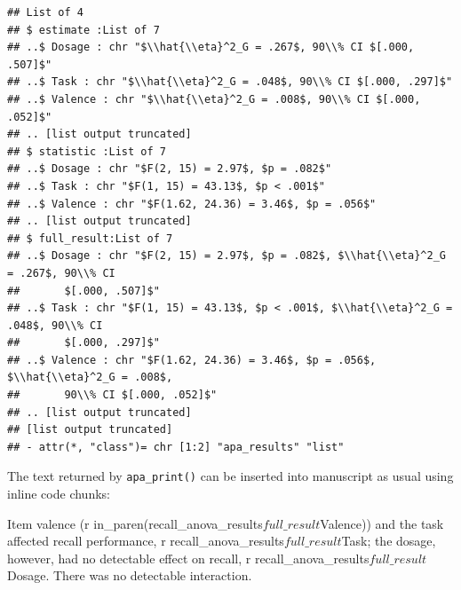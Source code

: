 \documentclass[
  ,man,floatsintext]{apa6}
\newenvironment{Shaded}{\begin{snugshade}}{\end{snugshade}}
\newcommand{\AttributeTok}[1]{\textcolor[rgb]{0.77,0.63,0.00}{#1}}
\newcommand{\FunctionTok}[1]{\textcolor[rgb]{0.00,0.00,0.00}{#1}}
\newcommand{\NormalTok}[1]{#1}
\newcommand{\StringTok}[1]{\textcolor[rgb]{0.31,0.60,0.02}{#1}}
\begin{document}
\begin{footnotesize}

\begin{verbatim}
## List of 4
## $ estimate :List of 7
## ..$ Dosage : chr "$\\hat{\\eta}^2_G = .267$, 90\\% CI $[.000, .507]$"
## ..$ Task : chr "$\\hat{\\eta}^2_G = .048$, 90\\% CI $[.000, .297]$"
## ..$ Valence : chr "$\\hat{\\eta}^2_G = .008$, 90\\% CI $[.000, .052]$"
## .. [list output truncated]
## $ statistic :List of 7
## ..$ Dosage : chr "$F(2, 15) = 2.97$, $p = .082$"
## ..$ Task : chr "$F(1, 15) = 43.13$, $p < .001$"
## ..$ Valence : chr "$F(1.62, 24.36) = 3.46$, $p = .056$"
## .. [list output truncated]
## $ full_result:List of 7
## ..$ Dosage : chr "$F(2, 15) = 2.97$, $p = .082$, $\\hat{\\eta}^2_G = .267$, 90\\% CI
##       $[.000, .507]$"
## ..$ Task : chr "$F(1, 15) = 43.13$, $p < .001$, $\\hat{\\eta}^2_G = .048$, 90\\% CI
##       $[.000, .297]$"
## ..$ Valence : chr "$F(1.62, 24.36) = 3.46$, $p = .056$, $\\hat{\\eta}^2_G = .008$,
##       90\\% CI $[.000, .052]$"
## .. [list output truncated]
## [list output truncated]
## - attr(*, "class")= chr [1:2] "apa_results" "list"
\end{verbatim}

\end{footnotesize}

The text returned by \texttt{apa\_print()} can be inserted into manuscript as usual using inline code chunks:

\begin{Shaded}
\begin{Highlighting}[]
\NormalTok{Item }\FunctionTok{valence}\NormalTok{ (}\StringTok{\textasciigrave{}}\AttributeTok{r in\_paren(recall\_anova\_results$full\_result$Valence)}\StringTok{\textasciigrave{}}\NormalTok{) and}
\NormalTok{the task affected recall performance,}
\StringTok{\textasciigrave{}}\AttributeTok{r recall\_anova\_results$full\_result$Task}\StringTok{\textasciigrave{}}\NormalTok{; the dosage, however, had no}
\NormalTok{detectable effect on recall, }\StringTok{\textasciigrave{}}\AttributeTok{r recall\_anova\_results$full\_result$Dosage}\StringTok{\textasciigrave{}}\NormalTok{.}
\NormalTok{There was no detectable interaction.}
\end{Highlighting}
\end{Shaded}
\end{document}
